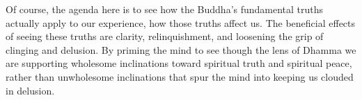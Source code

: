 Of course, the agenda here is to see how the Buddha's fundamental 
truths actually apply to our experience, how those truths affect us. 
The beneficial effects of seeing these truths are clarity, 
relinquishment, and loosening the grip of clinging and delusion. By 
priming the mind to see though the lens of Dhamma we are supporting 
wholesome inclinations toward spiritual truth and spiritual peace, 
rather than unwholesome inclinations that spur the mind into keeping us 
clouded in delusion.

